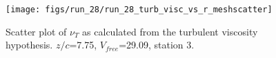 \begin{figure}[H]
\centering
\texttt{[image: figs/run\_28/run\_28\_turb\_visc\_vs\_r\_meshscatter]}
\caption{Scatter plot of $\nu_T$ as calculated from the turbulent viscosity hypothesis. $z/c$=7.75, $V_{free}$=29.09, station 3.}
\label{fig:run_28_turb_visc_vs_r_meshscatter}
\end{figure}


